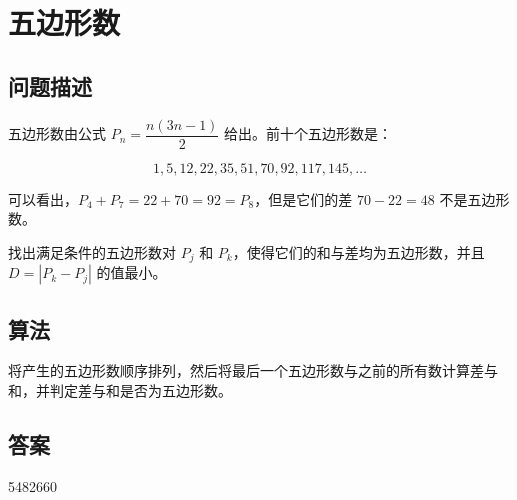 \section{五边形数}\label{sec:problem44}
\subsection{问题描述}
\begin{tcolorbox}
	五边形数由公式 $P_n = \dfrac{n(3n-1)}{2}$ 给出。前十个五边形数是：

	\[
		1, 5, 12, 22, 35, 51, 70, 92, 117, 145, \dots
	\]

	可以看出，$P_4 + P_7 = 22 + 70 = 92 = P_8$，但是它们的差 $70 - 22 = 48$ 不是五边形数。

	找出满足条件的五边形数对 $P_j$ 和 $P_k$，使得它们的和与差均为五边形数，并且 $D = |P_k - P_j|$ 的值最小。
\end{tcolorbox}

\subsection{算法}
将产生的五边形数顺序排列，然后将最后一个五边形数与之前的所有数计算差与和，并判定差与和是否为五边形数。

\subsection{答案}
5482660
